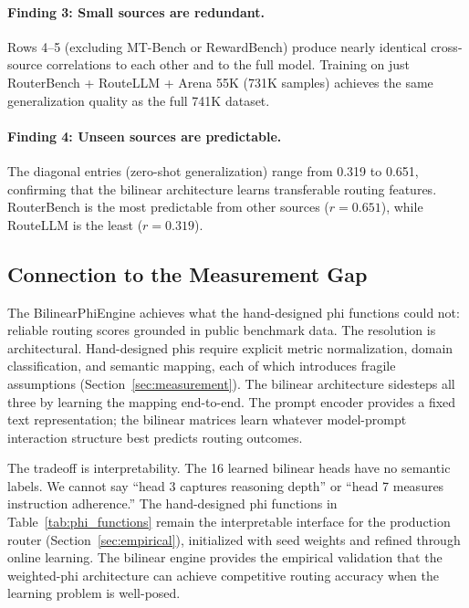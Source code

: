 \paragraph{Finding 3: Small sources are redundant.}
Rows 4--5 (excluding MT-Bench or RewardBench) produce nearly identical cross-source correlations to each other and to the full model. Training on just RouterBench + RouteLLM + Arena 55K (731K samples) achieves the same generalization quality as the full 741K dataset.

\paragraph{Finding 4: Unseen sources are predictable.}
The diagonal entries (zero-shot generalization) range from 0.319 to 0.651, confirming that the bilinear architecture learns transferable routing features. RouterBench is the most predictable from other sources ($r = 0.651$), while RouteLLM is the least ($r = 0.319$).

\subsection{Connection to the Measurement Gap}

The BilinearPhiEngine achieves what the hand-designed phi functions could not: reliable routing scores grounded in public benchmark data. The resolution is architectural. Hand-designed phis require explicit metric normalization, domain classification, and semantic mapping, each of which introduces fragile assumptions (Section~\ref{sec:measurement}). The bilinear architecture sidesteps all three by learning the mapping end-to-end. The prompt encoder provides a fixed text representation; the bilinear matrices learn whatever model-prompt interaction structure best predicts routing outcomes.

The tradeoff is interpretability. The 16 learned bilinear heads have no semantic labels. We cannot say ``head 3 captures reasoning depth'' or ``head 7 measures instruction adherence.'' The hand-designed phi functions in Table~\ref{tab:phi_functions} remain the interpretable interface for the production router (Section~\ref{sec:empirical}), initialized with seed weights and refined through online learning. The bilinear engine provides the empirical validation that the weighted-phi architecture can achieve competitive routing accuracy when the learning problem is well-posed.
